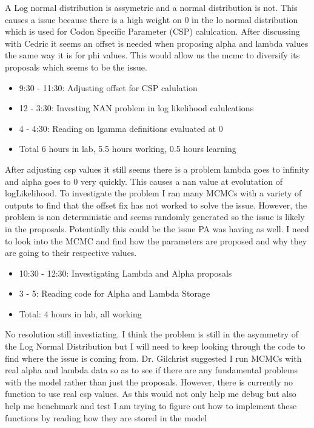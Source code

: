 \documentclass[12pt,hyperref]{labbook}
\begin{document}
A Log normal distribution is assymetric and a normal distribution is not. This causes a issue because there is a high weight on 0 in the lo normal distribution which is used for Codon Specific Parameter (CSP) calulcation. After discussing with Cedric it seems an offset is needed when proposing alpha and lambda values the same way it is for phi values. This would allow us the mcmc to diversify its proposals which seems to be the issue.
\begin{itemize}
    \item 9:30 - 11:30: Adjusting offset for CSP calulation
    \item 12 - 3:30: Investing NAN problem in log likelihood calulcations
    \item 4 - 4:30: Reading on lgamma definitions evaluated at 0
    \item Total 6 hours in lab, 5.5 hours working, 0.5 hours learning
\end{itemize}
After adjusting csp values it still seems there is a problem lambda goes to infinity and alpha goes to 0 very quickly. This causes a nan value at evolutation of logLikelihood.
To investigate the problem I ran many MCMCs with a variety of outputs to find that the offset fix has not worked to solve the issue. However, the problem is non deterministic and seems randomly generated so the issue is likely in the proposals. 
Potentially this could be the issue PA was having as well. I need to look into the MCMC and find how the parameters are proposed and why they are going to their respective values.
\begin{itemize}
    \item 10:30 - 12:30: Investigating Lambda and Alpha proposals
    \item 3 - 5: Reading code for Alpha and Lambda Storage
    \item Total: 4 hours in lab, all working
\end{itemize}
No resolution still investiating. I think the problem is still in the asymmetry of the Log Normal Distribution but I will need to keep looking through the code to find where the issue is coming from.
Dr. Gilchrist suggested I run MCMCs with real alpha and lambda data so as to see if there are any fundamental problems with the model rather than just the proposals. However, there is currently no function to use real csp values. As this would not only help me debug but also help me benchmark and test I am trying to figure out how to implement these functions by reading how they are stored in the model
\end{document}
